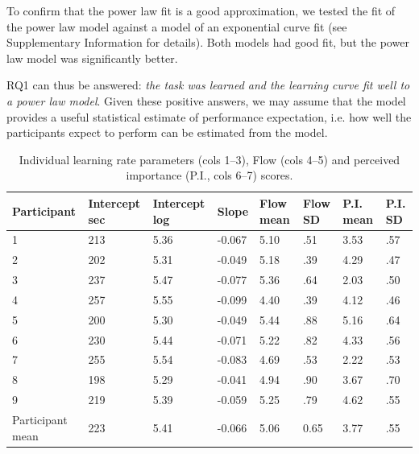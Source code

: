 \documentclass[fleqn,10pt]{wlscirep}
\begin{document}
To confirm that the power law fit is a good approximation, we tested the fit of the power law model against a model of an exponential curve fit (see Supplementary Information for details). Both models had good fit, but the power law model was significantly better.

RQ1 can thus be answered: {\it the task was learned and the learning curve fit well to a power law model}. Given these positive answers, we may assume that the model provides a useful statistical estimate of performance expectation, i.e. how well the participants expect to perform can be estimated from the model.

\begin{table}[ht]
\centering
\caption{\label{tab:LCxFlow}Individual learning rate parameters (cols 1--3), Flow (cols 4--5) and perceived importance (P.I., cols 6--7) scores.}
\begin{tabular}{llllllll}
\hline
Participant & Intercept sec & Intercept log & Slope  & Flow mean & Flow SD & P.I. mean & P.I. SD \\
\hline
1                & 213     & 5.36      & -0.067 & 5.10      & .51     & 3.53      & .57     \\
2                & 202     & 5.31      & -0.049 & 5.18      & .39     & 4.29      & .47     \\
3                & 237     & 5.47      & -0.077 & 5.36      & .64     & 2.03      & .50     \\
4                & 257     & 5.55      & -0.099 & 4.40      & .39     & 4.12      & .46     \\
5                & 200     & 5.30      & -0.049 & 5.44      & .88     & 5.16      & .64     \\
6                & 230     & 5.44      & -0.071 & 5.22      & .82     & 4.33      & .56     \\
7                & 255     & 5.54      & -0.083 & 4.69      & .53     & 2.22      & .53     \\
8                & 198     & 5.29      & -0.041 & 4.94      & .90     & 3.67      & .70     \\
9                & 219     & 5.39      & -0.059 & 5.25      & .79     & 4.62      & .55     \\
\hline
Participant mean & 223     & 5.41      & -0.066 & 5.06      & 0.65    & 3.77      & .55    	\\
\hline
\end{tabular}
\end{table}
\end{document}
